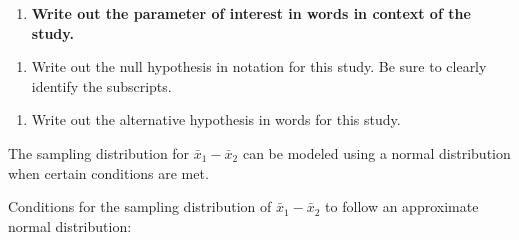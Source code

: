 \documentclass[
]{report}
\providecommand{\tightlist}{%
  \setlength{\itemsep}{0pt}\setlength{\parskip}{0pt}}
\begin{document}
\begin{enumerate}
\def\labelenumi{\arabic{enumi}.}
\tightlist
\item
  \textbf{Write out the parameter of interest in words in context of the study.}
\end{enumerate}

\vspace{0.8in}

\begin{enumerate}
\def\labelenumi{\arabic{enumi}.}
\setcounter{enumi}{1}
\tightlist
\item
  Write out the null hypothesis in notation for this study. Be sure to clearly identify the subscripts.
\end{enumerate}

\vspace{0.5in}

\begin{enumerate}
\def\labelenumi{\arabic{enumi}.}
\setcounter{enumi}{2}
\tightlist
\item
  Write out the alternative hypothesis in words for this study.
\end{enumerate}

\vspace{0.8in}

The sampling distribution for \(\bar{x}_1-\bar{x}_2\) can be modeled using a normal distribution when certain conditions are met.

Conditions for the sampling distribution of \(\bar{x}_1-\bar{x}_2\) to follow an approximate normal distribution:
\end{document}
